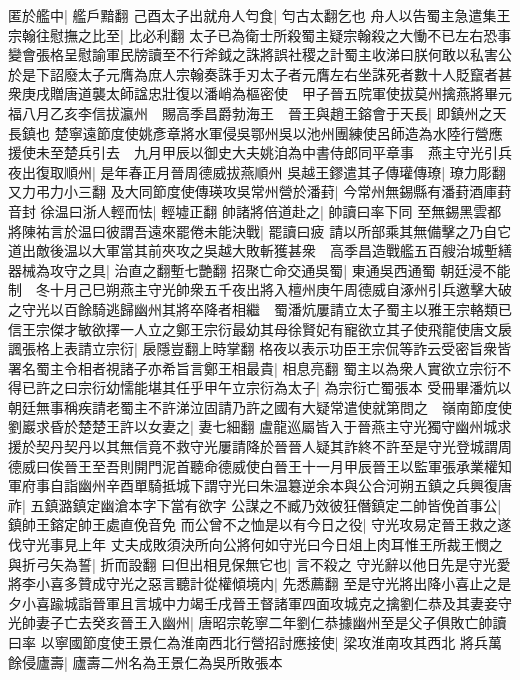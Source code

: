匿於艦中|{
	艦戶黯翻}
己酉太子出就舟人匄食|{
	匄古太翻乞也}
舟人以告蜀主急遣集王宗翰往慰撫之比至|{
	比必利翻}
太子已為衛士所殺蜀主疑宗翰殺之大慟不已左右恐事變會張格呈慰諭軍民牓讀至不行斧鉞之誅將誤社稷之計蜀主收涕曰朕何敢以私害公於是下詔廢太子元膺為庶人宗翰奏誅手刃太子者元膺左右坐誅死者數十人貶竄者甚衆庚戌贈唐道襲太師諡忠壯復以潘峭為樞密使　甲子晉五院軍使拔莫州擒燕將畢元福八月乙亥李信拔瀛州　賜高季昌爵勃海王　晉王與趙王鎔會于天長|{
	即鎮州之天長鎮也}
楚寧遠節度使姚彥章將水軍侵吳鄂州吳以池州團練使呂師造為水陸行營應援使未至楚兵引去　九月甲辰以御史大夫姚洎為中書侍郎同平章事　燕主守光引兵夜出復取順州|{
	是年春正月晉周德威拔燕順州}
吳越王鏐遣其子傳瓘傳璙|{
	璙力彫翻又力弔力小三翻}
及大同節度使傳瑛攻吳常州營於潘葑|{
	今常州無錫縣有潘葑酒庫葑音封}
徐温曰浙人輕而怯|{
	輕墟正翻}
帥諸將倍道赴之|{
	帥讀曰率下同}
至無錫黑雲都將陳祐言於温曰彼謂吾遠來罷倦未能決戰|{
	罷讀曰疲}
請以所部乘其無備擊之乃自它道出敵後温以大軍當其前夾攻之吳越大敗斬獲甚衆　高季昌造戰艦五百艘治城塹繕器械為攻守之具|{
	治直之翻塹七艷翻}
招聚亡命交通吳蜀|{
	東通吳西通蜀}
朝廷浸不能制　冬十月己巳朔燕主守光帥衆五千夜出將入檀州庚午周德威自涿州引兵邀擊大破之守光以百餘騎逃歸幽州其將卒降者相繼　蜀潘炕屢請立太子蜀主以雅王宗輅類已信王宗傑才敏欲擇一人立之鄭王宗衍最幼其母徐賢妃有寵欲立其子使飛龍使唐文扆諷張格上表請立宗衍|{
	扆隱豈翻上時掌翻}
格夜以表示功臣王宗侃等詐云受密旨衆皆署名蜀主令相者視諸子亦希旨言鄭王相最貴|{
	相息亮翻}
蜀主以為衆人實欲立宗衍不得已許之曰宗衍幼懦能堪其任乎甲午立宗衍為太子|{
	為宗衍亡蜀張本}
受冊畢潘炕以朝廷無事稱疾請老蜀主不許涕泣固請乃許之國有大疑常遣使就第問之　嶺南節度使劉巖求昏於楚楚王許以女妻之|{
	妻七細翻}
盧龍巡屬皆入于晉燕主守光獨守幽州城求援於契丹契丹以其無信竟不救守光屢請降於晉晉人疑其詐終不許至是守光登城謂周德威曰俟晉王至吾則開門泥首聽命德威使白晉王十一月甲辰晉王以監軍張承業權知軍府事自詣幽州辛酉單騎抵城下謂守光曰朱温簒逆余本與公合河朔五鎮之兵興復唐祚|{
	五鎮潞鎮定幽滄本字下當有欲字}
公謀之不臧乃效彼狂僭鎮定二帥皆俛首事公|{
	鎮帥王鎔定帥王處直俛音免}
而公曾不之恤是以有今日之役|{
	守光攻易定晉王救之遂伐守光事見上年}
丈夫成敗須決所向公將何如守光曰今日俎上肉耳惟王所裁王憫之與折弓矢為誓|{
	折而設翻}
曰但出相見保無它也|{
	言不殺之}
守光辭以他日先是守光愛將李小喜多贊成守光之惡言聽計從權傾境内|{
	先悉薦翻}
至是守光將出降小喜止之是夕小喜踰城詣晉軍且言城中力竭壬戌晉王督諸軍四面攻城克之擒劉仁恭及其妻妾守光帥妻子亡去癸亥晉王入幽州|{
	唐昭宗乾寧二年劉仁恭據幽州至是父子俱敗亡帥讀曰率}
以寧國節度使王景仁為淮南西北行營招討應接使|{
	梁攻淮南攻其西北}
將兵萬餘侵廬壽|{
	廬壽二州名為王景仁為吳所敗張本}


